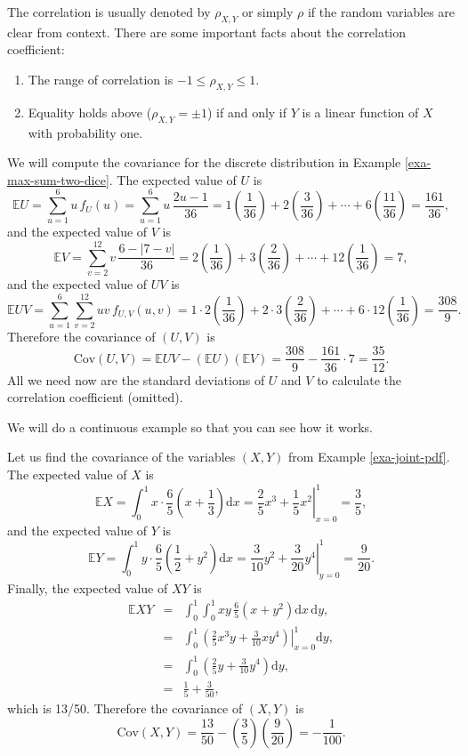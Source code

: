 \documentclass[captions=tableheading]{scrbook}
\begin{document}
The correlation is usually denoted by \(\rho_{X,Y}\) or simply \(\rho\) if the random variables are clear from context. There are some important facts about the correlation coefficient: 
\begin{enumerate}
\item The range of correlation is \(-1\leq\rho_{X,Y}\leq1\).
\item Equality holds above (\(\rho_{X,Y}=\pm1\)) if and only if \(Y\) is a linear function of \(X\) with probability one.
\end{enumerate}

\begin{example}

We will compute the covariance for the discrete distribution in Example \ref{exa-max-sum-two-dice}. The expected value of \(U\) is
\[
\mathbb{E} U=\sum_{u=1}^{6}u\, f_{U}(u)=\sum_{u=1}^{6}u\,\frac{2u-1}{36}=1\left(\frac{1}{36}\right)+2\left(\frac{3}{36}\right)+\cdots+6\left(\frac{11}{36}\right)=\frac{161}{36},
\]
and the expected value of \(V\) is
\[
\mathbb{E} V=\sum_{v=2}^{12}v\,\frac{6-|7-v|}{36}=2\left(\frac{1}{36}\right)+3\left(\frac{2}{36}\right)+\cdots+12\left(\frac{1}{36}\right)=7,
\]
and the expected value of \(UV\) is
\[
\mathbb{E} UV=\sum_{u=1}^{6}\sum_{v=2}^{12}uv\, f_{U,V}(u,v)=1\cdot2\left(\frac{1}{36}\right)+2\cdot3\left(\frac{2}{36}\right)+\cdots+6\cdot12\left(\frac{1}{36}\right)=\frac{308}{9}.
\]
Therefore the covariance of \((U,V)\) is
\[
\mbox{Cov}(U,V)=\mathbb{E} UV-\left(\mathbb{E} U\right)\left(\mathbb{E} V\right)=\frac{308}{9}-\frac{161}{36}\cdot7=\frac{35}{12}.
\]
All we need now are the standard deviations of \(U\) and \(V\) to calculate the correlation coefficient (omitted).
\end{example}

We will do a continuous example so that you can see how it works.

\begin{example}

Let us find the covariance of the variables \((X,Y)\) from Example \ref{exa-joint-pdf}. The expected value of \(X\) is
\[
\mathbb{E} X=\int_{0}^{1}x\cdot\frac{6}{5}\left(x+\frac{1}{3}\right)\mathrm{d} x=\left.\frac{2}{5}x^{3}+\frac{1}{5}x^{2}\right|_{x=0}^{1}=\frac{3}{5},
\]
and the expected value of \(Y\) is
\[
\mathbb{E} Y=\int_{0}^{1}y\cdot\frac{6}{5}\left(\frac{1}{2}+y^{2}\right)\mathrm{d} x=\left.\frac{3}{10}y^{2}+\frac{3}{20}y^{4}\right|_{y=0}^{1}=\frac{9}{20}.
\]
Finally, the expected value of \(XY\) is
\begin{eqnarray*}
\mathbb{E} XY & = & \int_{0}^{1}\int_{0}^{1}xy\,\frac{6}{5}\left(x+y^{2}\right)\mathrm{d} x\,\mathrm{d} y,\\
 & = & \int_{0}^{1}\left.\left(\frac{2}{5}x^{3}y+\frac{3}{10}xy^{4}\right)\right|_{x=0}^{1}\mathrm{d} y,\\
 & = & \int_{0}^{1}\left(\frac{2}{5}y+\frac{3}{10}y^{4}\right)\mathrm{d} y,\\
 & = & \frac{1}{5}+\frac{3}{50},
\end{eqnarray*}
which is 13/50. Therefore the covariance of \((X,Y)\) is
\[
\mbox{Cov}(X,Y)=\frac{13}{50}-\left(\frac{3}{5}\right)\left(\frac{9}{20}\right)=-\frac{1}{100}.
\]
\end{example}
\end{document}
